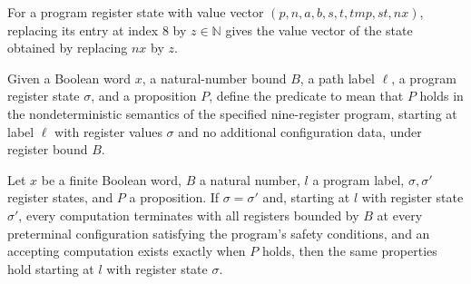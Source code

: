 \begin{lemma}
\label{Complexity.LogProg.PReg.u_8}
\leanok
{}
For a program register state with value vector $(p,n,a,b,s,t,tmp,st,nx)$, replacing its
entry at index $8$ by $z\in\mathbb{N}$ gives the value vector of the state obtained by
replacing $nx$ by $z$.
\end{lemma}

\begin{definition}
\label{Complexity.LogProg.PS}
\leanok
{}
Given a Boolean word $x$, a natural-number bound $B$, a path label $\ell$, a program
register state $\sigma$, and a proposition $P$, define the predicate to mean that $P$ holds
in the nondeterministic semantics of the specified nine-register program, starting at
label $\ell$ with register values $\sigma$ and no additional configuration data, under
register bound $B$.
\end{definition}

\begin{lemma}
\label{Complexity.LogProg.PS.of_eq}
\leanok
{}
Let $x$ be a finite Boolean word, $B$ a natural number, $l$ a program label, $\sigma,\sigma'$
register states, and $P$ a proposition. If $\sigma=\sigma'$ and, starting at $l$ with register
state $\sigma'$, every computation terminates with all registers bounded by $B$ at every
preterminal configuration satisfying the program’s safety conditions, and an accepting
computation exists exactly when $P$ holds, then the same properties hold starting at $l$
with register state $\sigma$.
\end{lemma}

